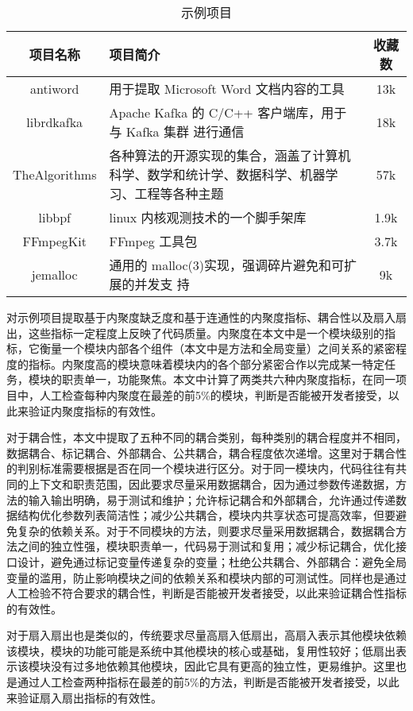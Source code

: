 \begin{table}[htbp]
\caption{示例项目}
\vspace{0.5em}\centering\wuhao
\begin{tabular}{cp{10cm}c}
\toprule
项目名称 & 项目简介 & 收藏数 \\
\midrule
antiword & 用于提取 Microsoft Word 文档内容的工具 & 13k\\
librdkafka & Apache Kafka 的 C/C++ 客户端库，用于与 Kafka 集群
进行通信 & 18k \\
TheAlgorithms & 各种算法的开源实现的集合，涵盖了计算机科学、数学和统计学、数据科学、机器学习、工程等各种主题 & 57k \\
libbpf & linux 内核观测技术的一个脚手架库 & 1.9k \\
FFmpegKit & FFmpeg 工具包 & 3.7k \\
jemalloc & 通用的 malloc(3)实现，强调碎片避免和可扩展的并发支
持 & 9k \\
\bottomrule
\end{tabular}
\end{table}

对示例项目提取基于内聚度缺乏度和基于连通性的内聚度指标、耦合性以及扇入扇出，这些指标一定程度上反映了代码质量。内聚度在本文中是一个模块级别的指标，它衡量一个模块内部各个组件（本文中是方法和全局变量）之间关系的紧密程度的指标。内聚度高的模块意味着模块内的各个部分紧密合作以完成某一特定任务，模块的职责单一，功能聚焦。本文中计算了两类共六种内聚度指标，在同一项目中，人工检查每种内聚度在最差的前5\%的模块，判断是否能被开发者接受，以此来验证内聚度指标的有效性。

对于耦合性，本文中提取了五种不同的耦合类别，每种类别的耦合程度并不相同，数据耦合、标记耦合、外部耦合、公共耦合，耦合程度依次递增。这里对于耦合性的判别标准需要根据是否在同一个模块进行区分。对于同一模块内，代码往往有共同的上下文和职责范围，因此要求尽量采用数据耦合，因为通过参数传递数据，方法的输入输出明确，易于测试和维护；允许标记耦合和外部耦合，允许通过传递数据结构优化参数列表简洁性；减少公共耦合，模块内共享状态可提高效率，但要避免复杂的依赖关系。对于不同模块的方法，则要求尽量采用数据耦合，数据耦合方法之间的独立性强，模块职责单一，代码易于测试和复用；减少标记耦合，优化接口设计，避免通过标记变量传递复杂的变量；杜绝公共耦合、外部耦合：避免全局变量的滥用，防止影响模块之间的依赖关系和模块内部的可测试性。同样也是通过人工检验不符合要求的耦合性，判断是否能被开发者接受，以此来验证耦合性指标的有效性。

对于扇入扇出也是类似的，传统要求尽量高扇入低扇出，高扇入表示其他模块依赖该模块，模块的功能可能是系统中其他模块的核心或基础，复用性较好；低扇出表示该模块没有过多地依赖其他模块，因此它具有更高的独立性，更易维护。这里也是通过人工检查两种指标在最差的前5\%的方法，判断是否能被开发者接受，以此来验证扇入扇出指标的有效性。

